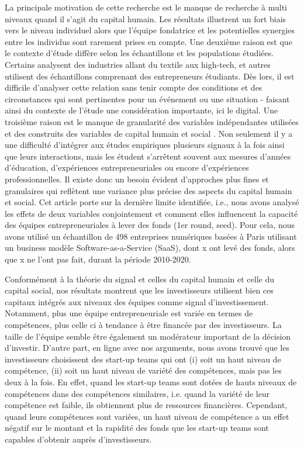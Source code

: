 \documentclass[12pt]{article}
\begin{document}
La principale motivation de cette recherche est le manque de recherche à multi niveaux quand il s'agit du capital humain. Les résultats \citep{marvel2016human} illustrent un fort biais vers le niveau individuel alors que l'équipe fondatrice et les potentielles synergies entre les individus sont rarement prises en compte. Une deuxième raison est que le contexte d'étude diffère selon les échantillons et les populations étudiées. Certains analysent des industries allant du textile aux high-tech, et autres utilisent des échantillons comprenant des entrepreneurs étudiants. Dès lors, il est difficile d'analyser cette relation sans tenir compte des conditions et des circonstances qui sont pertinentes pour un événement ou une situation - faisant ainsi du contexte de l'étude une considération importante, ici le digital. Une troisième raison est le manque de granularité des variables indépendantes utilisées et des construits des variables de capital humain et social \citep{harrison2007s}. Non seulement il y a une difficulté d'intégrer aux études empiriques plusieurs signaux à la fois ainsi que leurs interactions, mais les étudent s'arrêtent souvent aux mesures d'années d'éducation, d'expériences entrepreneuriales ou encore d'expériences professionnelles. Il existe donc un besoin évident d'approches plus fines et granulaires qui reflètent une variance plus précise des aspects du capital humain et social. Cet article porte sur la dernière limite identifiée, i.e., nous avons analysé les effets de deux variables conjointement et comment elles influencent la capacité des équipes entrepreneuriales à lever des fonds (1er round, seed). Pour cela, nous avons utilisé un échantillon de 498 entreprises numériques basées à Paris utilisant un business modèle Software-as-a-Service (SaaS), dont x ont levé des fonds, alors que x ne l'ont pas fait, durant la période 2010-2020.

Conformément à la théorie du signal et celles du capital humain et celle du capital social, nos résultats montrent que les investisseurs utilisent bien ces capitaux intégrés aux niveaux des équipes comme signal d'investissement. Notamment, plus une équipe entrepreneuriale est variée en termes de compétences, plus celle ci à tendance à être financée par des investisseurs. La taille de l'équipe semble être également un modérateur important de la décision d'investir. D'autre part, en ligne avec nos arguments, nous avons trouvé que les investisseurs choisissent des start-up teams qui ont (i) soit un haut niveau de compétence, (ii) soit un haut niveau de variété des compétences, mais pas les deux à la fois. En effet, quand les start-up teams sont dotées de hauts niveaux de compétences dans des compétences similaires, i.e. quand la variété de leur compétence est faible, ils obtiennent plus de ressources financières. Cependant, quand leurs compétences sont variées, un haut niveau de compétence a un effet négatif sur le montant et la rapidité des fonds que les start-up teams sont capables d'obtenir auprès d'investisseurs.
\end{document}
